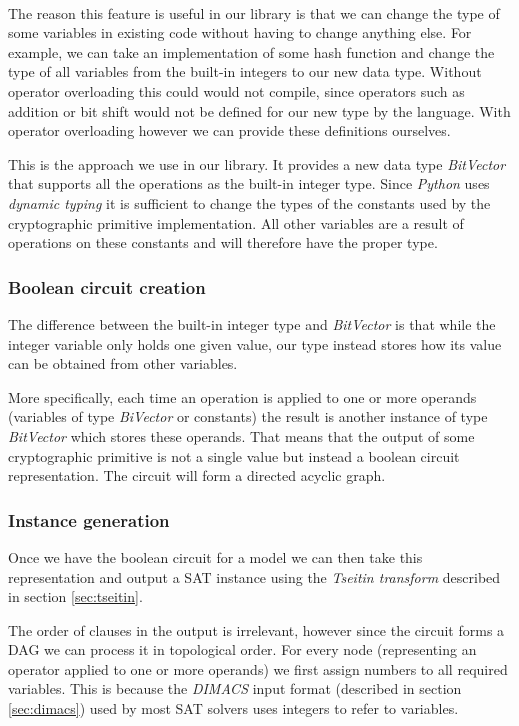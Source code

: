 ~\\

The reason this feature is useful in our library is that we can change the type of some variables in existing code without having to change anything else.
For example, we can take an implementation of some hash function and change the type of all variables from the built-in integers to our new data type.
Without operator overloading this could would not compile, since operators such as addition or bit shift would not be defined for our new type by the language.
With operator overloading however we can provide these definitions ourselves.

This is the approach we use in our library.
It provides a new data type \emph{BitVector} that supports all the operations as the built-in integer type.
Since \emph{Python} uses \emph{dynamic typing} it is sufficient to change the types of the constants used by the cryptographic primitive implementation.
All other variables are a result of operations on these constants and will therefore have the proper type.

\subsubsection{Boolean circuit creation}
The difference between the built-in integer type and \emph{BitVector} is that while the integer variable only holds one given value, our type instead stores how its value can be obtained from other variables.

More specifically, each time an operation is applied to one or more operands (variables of type \emph{BiVector} or constants) the result is another instance of type \emph{BitVector} which stores these operands.  That means that the output of some cryptographic primitive is not a single value but instead a boolean circuit representation. The circuit will form a directed acyclic graph.

\subsubsection{Instance generation}
Once we have the boolean circuit for a model we can then take this representation and output a SAT instance using the \emph{Tseitin transform} described in section \ref{sec:tseitin}.

The order of clauses in the output is irrelevant, however since the circuit forms a DAG we can process it in topological order.
For every node (representing an operator applied to one or more operands) we first assign numbers to all required variables.
This is because the \emph{DIMACS} input format (described in section \ref{sec:dimacs}) used by most SAT solvers uses integers to refer to variables.

